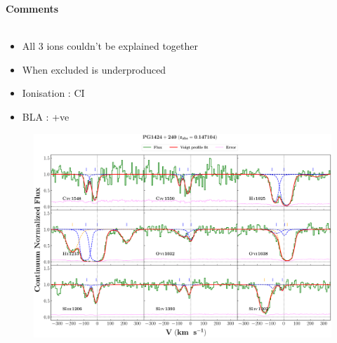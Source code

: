 \documentclass[12pt,draft]{report}
\newcommand\ion[2]{\text{#1\,\textsc{\lowercase{#2}}}}
\begin{document}
\newpage

\textbf{Comments}
\\\\
\begin{itemize}
    \item All 3 ions couldn't be explained together
    \item When excluded \ion{O}{vi} is underproduced
    \item Ionisation : CI
    \item BLA : +ve
\end{itemize}


\newpage


\begin{landscape}

    \begin{figure}
    \centering
    \vspace{-20mm}
    \hspace*{-35mm}
    \includegraphics[width=1.25\linewidth]{System-Plots/PG1424+240_z=0.147104_sys_plot.png}
    \end{figure}
    
\end{landscape}
\end{document}
